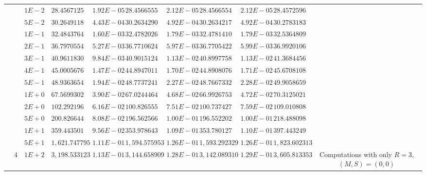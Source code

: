 \begin{landscape}
\begin{table}[ht]
{\begin{tabular}[c]{c|c|c|c|c|c|c|c|c|c|c}
& &$1E-2$ & $28.456712525178$ & $1.92E-05$ & $28.456655526319$ & $2.12E-05$ & $28.456655471930$ & $2.12E-05$ & $28.457259680513$ &  \\
& &$5E-2$ & $30.264911808725$ & $4.43E-04$ & $30.263429009206$ & $4.92E-04$ & $30.263421756722$ & $4.92E-04$ & $30.278318327442$ &  \\
& &$1E-1$ & $32.484376480755$ & $1.60E-03$ & $32.478202624544$ & $1.79E-03$ & $32.478141067399$ & $1.79E-03$ & $32.536480931004$ &  \\
& &$2E-1$ & $36.797055408932$ & $5.27E-03$ & $36.771062499380$ & $5.97E-03$ & $36.770542250789$ & $5.99E-03$ & $36.992010607447$ &  \\
& &$3E-1$ & $40.961183077452$ & $9.84E-03$ & $40.901512484210$ & $1.13E-02$ & $40.899775842855$ & $1.13E-02$ & $41.368445666447$ &  \\
& &$4E-1$ & $45.000567680461$ & $1.47E-02$ & $44.894701107258$ & $1.70E-02$ & $44.890807609895$ & $1.71E-02$ & $45.670810879121$ &  \\
& &$5E-1$ & $48.936365417564$ & $1.94E-02$ & $48.773724150896$ & $2.27E-02$ & $48.766733218374$ & $2.28E-02$ & $49.905865978617$ &  \\
& &$1E+0$ & $67.569930222732$ & $3.90E-02$ & $67.024446498457$ & $4.68E-02$ & $66.992675350455$ & $4.72E-02$ & $70.312502175757$ &  \\
& &$2E+0$ & $102.292196585864$ & $6.16E-02$ & $100.826555465561$ & $7.51E-02$ & $100.737427532380$ & $7.59E-02$ & $109.010808418516$ &  \\
& &$5E+0$ & $200.826644244514$ & $8.08E-02$ & $196.562566888881$ & $1.00E-01$ & $196.552202980407$ & $1.00E-01$ & $218.488098056035$ &  \\
& &$1E+1$ & $359.443501215690$ & $9.56E-02$ & $353.978643401936$ & $1.09E-01$ & $353.780127476716$ & $1.10E-01$ & $397.443249829703$ &  \\
& &$5E+1$ & $1,621.747795925120$ & $1.11E-01$ & $1,594.575953000710$ & $1.26E-01$ & $1,593.292329511550$ & $1.26E-01$ & $1,823.602313382110$ &  \\
& \multirow{-23}{*}{4} &$1E+2$ & $3,198.533123735590$ & $1.13E-01$ & $3,144.658909324040$ & $1.28E-01$ & $3,142.089310529960$ & $1.29E-01$ & $3,605.813353473020$ & \multirow{-23}{3cm}{Computations with only $R=3$, $(M,S)=(0,0)$}  \\  \cline{2-11}


\end{tabular}}
\end{table}
\end{landscape}
